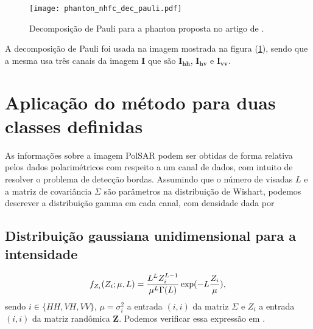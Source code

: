 \begin{figure}[hbt]
\centering
	\texttt{[image: phanton\_nhfc\_dec\_pauli.pdf]}
	\caption{Decomposição de Pauli para a phanton proposta no artigo de \citet{nhfc}.}\label{cap_acf_fig01}
\end{figure}
A decomposição de Pauli foi usada na imagem mostrada na figura (\ref{cap_acf_fig01}), sendo que a mesma usa três canais da imagem \textbf{I} que são $\mathbf{I_{hh}}$, $\mathbf{I_{hv}}$ e $\mathbf{I_{vv}}$. 
	
\section{Aplicação do método  para duas classes definidas}

As informações sobre a imagem PolSAR podem ser obtidas de forma relativa pelos dados polarimétricos com respeito a um canal de dados, com intuito de resolver o problema de detecção bordas. Assumindo que o número de visadas $L$ e a matriz de covariância  $\Sigma$ são parâmetros na distribuição de Wishart, podemos descrever a distribuição gamma em cada canal, com densidade dada por 
\subsection{Distribuição gaussiana unidimensional para a intensidade}
\begin{equation}\label{cap_acf_23}
	f_{Z_{i}}(Z_{i};\mu,L)=\frac{L^{L}Z_{i}^{L-1}}{\mu^L\Gamma(L)} \exp(-L\frac{Z_i}{\mu}), \\
\end{equation}
sendo $i\in \{HH, VH, VV\}$, $\mu=\sigma_{i}^2$ a entrada $(i,i)$ da matriz $\Sigma$ e $Z_{i}$ a entrada $(i,i)$ da matriz randômica $\mathbf{Z}$. Podemos verificar essa expressão em \citep{fnc, nhfc, hsbmp}.	 

